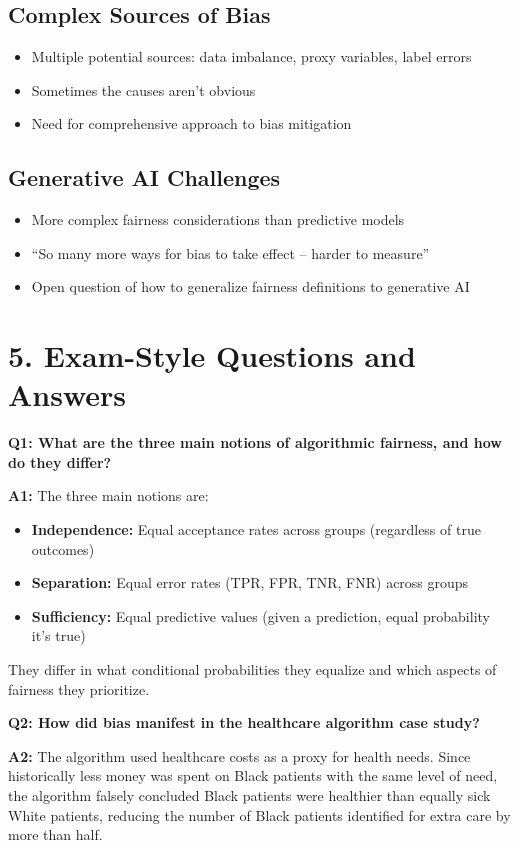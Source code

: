 \subsection*{Complex Sources of Bias}
\begin{itemize}
    \item Multiple potential sources: data imbalance, proxy variables, label errors
    \item Sometimes the causes aren't obvious
    \item Need for comprehensive approach to bias mitigation
\end{itemize}

\subsection*{Generative AI Challenges}
\begin{itemize}
    \item More complex fairness considerations than predictive models
    \item ``So many more ways for bias to take effect -- harder to measure''
    \item Open question of how to generalize fairness definitions to generative AI
\end{itemize}
\section*{5. Exam-Style Questions and Answers}

\textbf{Q1: What are the three main notions of algorithmic fairness, and how do they differ?}

\textbf{A1:} The three main notions are:
\begin{itemize}
    \item \textbf{Independence:} Equal acceptance rates across groups (regardless of true outcomes)
    \item \textbf{Separation:} Equal error rates (TPR, FPR, TNR, FNR) across groups
    \item \textbf{Sufficiency:} Equal predictive values (given a prediction, equal probability it's true)
\end{itemize}
They differ in what conditional probabilities they equalize and which aspects of fairness they prioritize.

\vspace{0.3cm}
\textbf{Q2: How did bias manifest in the healthcare algorithm case study?}

\textbf{A2:} The algorithm used healthcare costs as a proxy for health needs. Since historically less money was spent on Black patients with the same level of need, the algorithm falsely concluded Black patients were healthier than equally sick White patients, reducing the number of Black patients identified for extra care by more than half.

